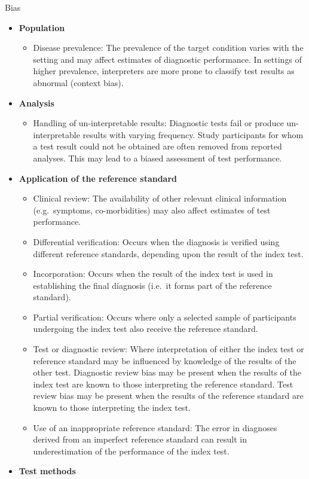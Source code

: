 \documentclass[
  11pt,
  a4paper,
  DIV=11,
  numbers=noendperiod]{scrreprt}
\providecommand{\tightlist}{%
  \setlength{\itemsep}{0pt}\setlength{\parskip}{0pt}}
\begin{document}
Bias

\begin{itemize}
\item
  \textbf{Population}

  \begin{itemize}
  \tightlist
  \item
    Disease prevalence: The prevalence of the target condition varies
    with the setting and may affect estimates of diagnostic performance.
    In settings of higher prevalence, interpreters are more prone to
    classify test results as abnormal (context bias).
  \end{itemize}
\item
  \textbf{Analysis}

  \begin{itemize}
  \tightlist
  \item
    Handling of un-interpretable results: Diagnostic tests fail or
    produce un-interpretable results with varying frequency. Study
    participants for whom a test result could not be obtained are often
    removed from reported analyses. This may lead to a biased assessment
    of test performance.
  \end{itemize}
\item
  \textbf{Application of the reference standard}

  \begin{itemize}
  \item
    Clinical review: The availability of other relevant clinical
    information (e.g.~symptoms, co-morbidities) may also affect
    estimates of test performance.
  \item
    Differential verification: Occurs when the diagnosis is verified
    using different reference standards, depending upon the result of
    the index test.
  \item
    Incorporation: Occurs when the result of the index test is used in
    establishing the final diagnosis (i.e.~it forms part of the
    reference standard).
  \item
    Partial verification: Occurs where only a selected sample of
    participants undergoing the index test also receive the reference
    standard.
  \item
    Test or diagnostic review: Where interpretation of either the index
    test or reference standard may be influenced by knowledge of the
    results of the other test. Diagnostic review bias may be present
    when the results of the index test are known to those interpreting
    the reference standard. Test review bias may be present when the
    results of the reference standard are known to those interpreting
    the index test.
  \item
    Use of an inappropriate reference standard: The error in diagnoses
    derived from an imperfect reference standard can result in
    underestimation of the performance of the index test.
  \end{itemize}
\item
  \textbf{Test methods}


\end{itemize}
\end{document}
